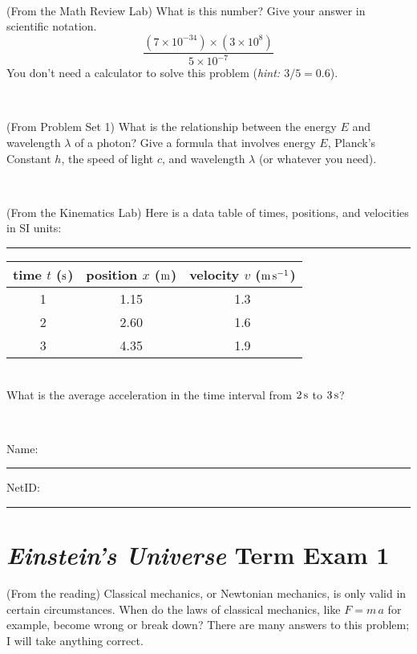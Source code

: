 \documentclass[12pt, letterpaper]{article}
\begin{document}
\vfill ~

\begin{problem} (From the Math Review Lab)
What is this number? Give your answer in scientific notation.
$$
\frac{(7\times10^{-34})\times(3\times10^8)}{5\times10^{-7}}
$$
You don't need a calculator to solve this problem (\textit{hint: $3/5=0.6$}).
\end{problem}


\vfill ~

\begin{problem} (From Problem Set 1)
What is the relationship between the energy $E$ and wavelength
$\lambda$ of a photon? Give a formula that involves energy $E$,
Planck's Constant $h$, the speed of light $c$, and wavelength
$\lambda$ (or whatever you need).
\end{problem}

\vfill ~

\begin{problem} (From the Kinematics Lab)
Here is a data table of times, positions, and velocities in SI units:\\
\rule{1.0in}{0pt}\begin{tabular}{c|c|c}
time $t$ ($\mathrm{s}$) & position $x$ ($\mathrm{m}$) & velocity $v$ ($\mathrm{m}\,\mathrm{s}^{-1}$) \\
\hline
1 & 1.15 & 1.3 \\
2 & 2.60 & 1.6 \\
3 & 4.35 & 1.9 \\
\hline
\end{tabular}\\
What is the average acceleration in the time interval from $2\,\mathrm{s}$ to $3\,\mathrm{s}$?
\end{problem}


\vfill ~


\cleardoublepage



\noindent
Name: \rule[-1ex]{0.60\textwidth}{0.1pt}
NetID: \rule[-1ex]{0.20\textwidth}{0.1pt}

\section*{\textsl{Einstein's Universe} Term Exam 1}
\setcounter{problem}{1}


\begin{problem} (From the reading)
Classical mechanics, or Newtonian mechanics, is only valid in certain
circumstances. When do the laws of classical mechanics, like $F =
m\,a$ for example, become wrong or break down? There are many answers
to this problem; I will take anything correct.
\end{problem}
\end{document}
